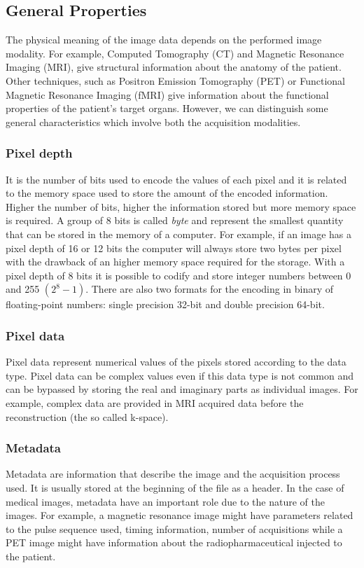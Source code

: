 \documentclass{standalone}
\begin{document}
\subsection{General Properties}
The physical meaning of the image data depends on the performed image modality.
For example, Computed Tomography (CT) and Magnetic Resonance Imaging (MRI), give structural information about the anatomy of the patient.
Other techniques, such as Positron Emission Tomography (PET) or Functional Magnetic Resonance Imaging (fMRI) give information about the functional properties of the patient's target organs. 
However, we can distinguish some general characteristics which involve both the acquisition modalities.

\subsubsection{Pixel depth} 
It is the number of bits used to encode the values of each pixel and it is related to the memory space used to store the amount of the encoded information\cite{Larobina}. 
Higher the number of bits, higher the information stored but more memory space is required\cite{Larobina}. 
A group of 8 bits is called \textit{byte} and represent the smallest quantity that can be stored in the memory of a computer.
For example, if an image has a pixel depth of 16 or 12 bits the computer will always store two bytes per pixel with the drawback of an higher memory space required for the storage\cite{Larobina}.
With a pixel depth of 8 bits it is possible to codify and store integer numbers between 0 and 255 $(2^8-1)$.
There are also two formats for the encoding in binary of floating-point numbers: single precision 32-bit and double precision 64-bit.

\subsubsection{Pixel data} 
Pixel data represent numerical values of the pixels stored according to the data type.
Pixel data can be complex values even if this data type is not common and can be bypassed by storing the real and imaginary parts as individual images.
For example, complex data are provided in MRI acquired data before the reconstruction (the so called k-space)\cite{Larobina}.


\subsubsection{Metadata} 
Metadata are information that describe the image and the acquisition process used. It is usually stored at the beginning of the file as a header\cite{Larobina}. 
In the case of medical images, metadata have an important role due to the nature of the images.
For example, a magnetic resonance image might have parameters related to the pulse sequence used, timing information, number of acquisitions while a PET image might have information about the radiopharmaceutical injected to the patient.
\end{document}
